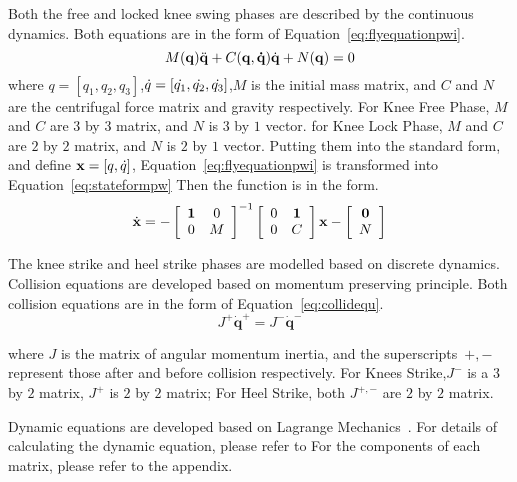 \begin{itemize}
Both the free and locked knee swing phases are described by the continuous dynamics.
Both equations are in the form of Equation~\ref{eq:flyequationpwi}.
\begin{equation}
\label{eq:flyequationpwi}
M(\mathbf{q}) \ddot{\mathbf{q}} + C(\mathbf{q,\dot{q}})\dot{\mathbf{q}} + N(\mathbf{q}) = 0
\end{equation}
where $q=[q_1,q_2,q_3]$,$\dot{q}=[\dot{q_1},\dot{q_2},\dot{q_3}]$,$M$ is the initial mass matrix,  and $C$ and $N$ are the centrifugal force matrix and gravity respectively. 
For Knee Free Phase,  $M$ and $C$ are $3$ by $3$ matrix, and $N$ is $3$ by $1$ vector.
for Knee Lock Phase, $M$ and $C$ are $2$ by $2$ matrix, and $N$ is $2$ by $1$ vector.
Putting them into the standard form, and define $\mathbf{x}=[q,\dot{q}]$, Equation~\ref{eq:flyequationpwi} is transformed into Equation~\ref{eq:stateformpw}
Then the function is in the form.
\begin{equation}
\label{eq:stateformpw}
\dot{\mathbf{x}}=
-\left[ 
\begin{array}{cc}
\mathbf{1} &0\\
0 &M 
\end{array}
\right]^{-1}
\left[ 
\begin{array}{cc}
0 &\mathbf{1}\\
0 &C 
\end{array}
\right]\mathbf{x}
-\left[ 
\begin{array}{c}
\mathbf{0}\\
 N 
\end{array}
\right]
\end{equation}

The knee strike and heel strike phases are modelled based on discrete dynamics.
Collision equations are developed based on momentum preserving principle.
Both collision equations are in the form of Equation~\ref{eq:collidequ}.
\begin{equation}
\label{eq:collidequ}
J^{+}\dot{\mathbf{q}}^{+} = J^{-}\dot{\mathbf{q}}^{-}
\end{equation}

where $J$ is the matrix of angular momentum inertia, and the superscripts~$+,-$ represent those after and before collision respectively.
For Knees Strike,$J^-$ is a $3$ by $2$ matrix, $J^+$ is $2$ by $2$ matrix;
For Heel Strike, both $J^{+,-}$ are $2$ by $2$ matrix.
\end{itemize}
Dynamic equations are developed based on Lagrange Mechanics~\citep{Goldstein2002}.
For details of calculating the dynamic equation, please refer to \citep{Chen2007}
For the components of each matrix, please refer to the appendix.


